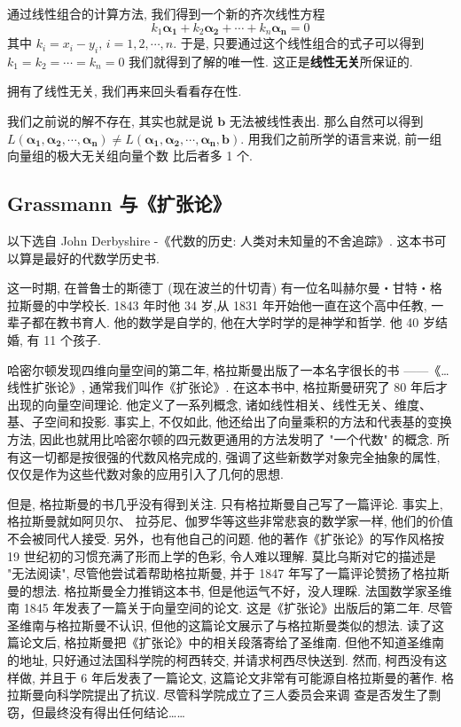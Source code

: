 \documentclass[UTF8]{book}
\begin{document}
通过线性组合的计算方法, 我们得到一个新的齐次线性方程 
$$k_1 \boldsymbol{\alpha_1} + k_2 \boldsymbol{\alpha_2} +
\cdots + k_n \boldsymbol{\alpha_n} = 0$$ 其中 $k_i = x_i - y_i, \,
i = 1,2, \cdots ,n$. 
于是, 只要通过这个线性组合的式子可以得到 
$ k_1 = k_2 = \cdots = k_n = 0 $ 我们就得到了解的唯一性. 
这正是\textbf{线性无关}所保证的. 

拥有了线性无关, 我们再来回头看看存在性. 

我们之前说的解不存在, 其实也就是说 $\boldsymbol{b}$ 无法被线性表出. 
那么自然可以得到 $L(\boldsymbol{\alpha_1},
\boldsymbol{\alpha_2},\cdots, \boldsymbol{\alpha_n}) \neq
L(\boldsymbol{\alpha_1},
\boldsymbol{\alpha_2},\cdots, \boldsymbol{\alpha_n},\boldsymbol{b})$. 
用我们之前所学的语言来说, 前一组向量组的极大无关组向量个数
比后者多 1 个.



\subsection{Grassmann 与《扩张论》}

\songti
以下选自 John Derbyshire -《代数的历史: 人类对未知量的不舍追踪》. 
这本书可以算是最好的代数学历史书. 
\vspace*{0.8cm}

\kaishu
这一时期, 在普鲁士的斯德丁 (现在波兰的什切青) 有一位名叫赫尔曼・甘特・格拉斯曼的中学校长. 
1843 年时他 34 岁,从 1831 年开始他一直在这个高中任教, 一辈子都在教书育人. 
他的数学是自学的, 他在大学时学的是神学和哲学. 他 40 岁结婚, 有 11 个孩子.


哈密尔顿发现四维向量空间的第二年, 格拉斯曼出版了一本名字很长的书 ——《…线性扩张论》, 
通常我们叫作《扩张论》. 在这本书中, 格拉斯曼研究了 80 年后才出现的向量空间理论. 
他定义了一系列概念, 诸如线性相关、线性无关、维度、基、子空间和投影. 事实上, 
不仅如此, 他还给出了向量乘积的方法和代表基的变换方法, 
因此也就用比哈密尔顿的四元数更通用的方法发明了 "一个代数" 的概念. 
所有这一切都是按很强的代数风格完成的, 强调了这些新数学对象完全抽象的属性, 
仅仅是作为这些代数对象的应用引入了几何的思想. 

但是, 格拉斯曼的书几乎没有得到关注. 只有格拉斯曼自己写了一篇评论. 事实上, 格拉斯曼就如阿贝尔、
拉芬尼、伽罗华等这些非常悲哀的数学家一样, 他们的价值不会被同代人接受. 
另外，也有他自己的问题. 他的著作《扩张论》的写作风格按 19 世纪初的习惯充满了形而上学的色彩, 
令人难以理解. 莫比乌斯对它的描述是 "无法阅读", 尽管他尝试着帮助格拉斯曼, 
并于 1847 年写了一篇评论赞扬了格拉斯曼的想法. 格拉斯曼全力推销这本书, 
但是他运气不好，没人理睬. 
法国数学家圣维南 1845 年发表了一篇关于向量空间的论文. 
这是《扩张论》出版后的第二年. 尽管圣维南与格拉斯曼不认识, 
但他的这篇论文展示了与格拉斯曼类似的想法. 读了这篇论文后, 
格拉斯曼把《扩张论》中的相关段落寄给了圣维南. 但他不知道圣维南的地址, 
只好通过法国科学院的柯西转交, 并请求柯西尽快送到. 然而, 柯西没有这样做, 
并且于 6 年后发表了一篇论文, 这篇论文非常有可能源自格拉斯曼的著作. 
格拉斯曼向科学院提出了抗议. 尽管科学院成立了三人委员会来调
查是否发生了剽窃，但最终没有得出任何结论……
\end{document}
